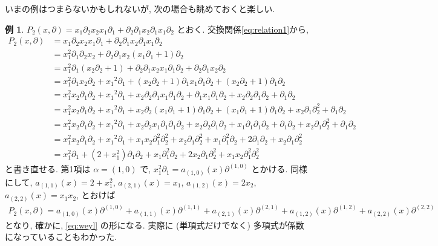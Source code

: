\documentclass[11pt, a4paper, dvipdfmx]{jsarticle}
\theoremstyle{definition}
\newtheorem{Example}[Axiom]{例}
\newcommand{\p}{\partial}
\numberwithin{equation}{section}
\begin{document}
いまの例はつまらないかもしれないが, 
次の場合も眺めておくと楽しい. 

\begin{Example}
    $P_2(x,\p) 
    = x_1\p_2x_2x_1\p_1
    + \p_2\p_1x_2\p_1x_1\p_2$ 
    とおく. 交換関係\eqref{eq:relation1}から, 
    \begin{align*}
        P_2(x,\p)
        &= x_1\p_2x_2x_1\p_1
        + \p_2\p_1x_2\p_1x_1\p_2 \\
        &= x_1^2\p_1\p_2x_2 
        + \p_2\p_1x_2(x_1\p_1 + 1)\p_2 \\
        &= x_1^2\p_1(x_2\p_2 + 1)
        +  \p_2\p_1x_2x_1\p_1\p_2
        +  \p_2\p_1x_2\p_2 \\
        &= x_1^2\p_1x_2\p_2 + {x_1}^2\p_1 
        + (x_2\p_2 + 1)\p_1x_1\p_1\p_2
        + (x_2\p_2 + 1)\p_1\p_2 \\
        &= x_1^2x_2\p_1\p_2 + {x_1}^2\p_1 
        + x_2\p_2\p_1x_1\p_1\p_2
        + \p_1x_1\p_1\p_2
        + x_2\p_2\p_1\p_2
        + \p_1\p_2 \\
        &= x_1^2x_2\p_1\p_2 + {x_1}^2\p_1 
        + x_2\p_2(x_1\p_1 + 1)\p_1\p_2 
        + (x_1\p_1 + 1)\p_1\p_2
        + x_2\p_1\p_2^2 + \p_1\p_2 \\
        &= x_1^2x_2\p_1\p_2 + {x_1}^2\p_1 
        + x_2\p_2x_1\p_1\p_1\p_2
        + x_2\p_2\p_1\p_2 
        + x_1\p_1\p_1\p_2
        + \p_1\p_2
        + x_2\p_1\p_2^2 + \p_1\p_2 \\
        &= x_1^2x_2\p_1\p_2 + {x_1}^2\p_1 
        + x_1x_2\p_1^2\p_2^2
        + x_2\p_1\p_2^2 
        + x_1\p_1^2\p_2
        + 2\p_1\p_2
        + x_2\p_1\p_2^2 \\
        &= x_1^2\p_1 
        + (2 + x_1^2)\p_1\p_2 
        + x_1\p_1^2\p_2
        + 2x_2\p_1\p_2^2
        + x_1x_2\p_1^2\p_2^2
    \end{align*}
    と書き直せる. 第1項は $\alpha = (1,0)$ で, 
    $x_1^2\p_1 = a_{(1,0)}(x)\p^{(1,0)}$
    とかける. 同様にして, 
    $a_{(1,1)}(x) = 2 + x_1^2$, 
    $a_{(2,1)}(x) = x_1$, 
    $a_{(1,2)}(x) = 2x_2$,
    $a_{(2,2)}(x) = x_1x_2$,
    とおけば
    \begin{align*}
        P_2(x,\p)
        = a_{(1,0)}(x)\p^{(1,0)} 
        + a_{(1,1)}(x)\p^{(1,1)} 
        + a_{(2,1)}(x)\p^{(2,1)}
        + a_{(1,2)}(x)\p^{(1,2)} 
        + a_{(2,2)}(x)\p^{(2,2)}  
    \end{align*}
    となり, 確かに, \eqref{eq:weyl} の形になる. 
    実際に (単項式だけでなく) 多項式が係数になっていることもわかった. 
\end{Example}
\end{document}
